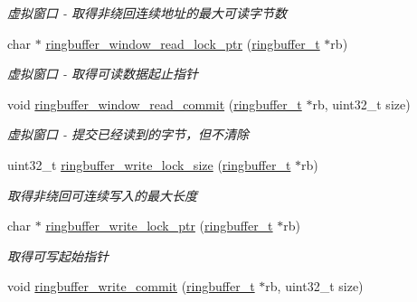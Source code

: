 \begin{DoxyCompactItemize}
\begin{DoxyCompactList}\small\item\em 虚拟窗口 -\/ 取得非绕回连续地址的最大可读字节数 \end{DoxyCompactList}\item 
char $\ast$ \hyperlink{a00083_a2fc4c4b70a7f3959c0c82c99432ed04d_a2fc4c4b70a7f3959c0c82c99432ed04d}{ringbuffer\+\_\+window\+\_\+read\+\_\+lock\+\_\+ptr} (\hyperlink{a00050_af929c5cf86b6a0f64dde407dfe60482e_af929c5cf86b6a0f64dde407dfe60482e}{ringbuffer\+\_\+t} $\ast$rb)
\begin{DoxyCompactList}\small\item\em 虚拟窗口 -\/ 取得可读数据起止指针 \end{DoxyCompactList}\item 
void \hyperlink{a00083_a5bccc516abce64ee739ed00bf055d42e_a5bccc516abce64ee739ed00bf055d42e}{ringbuffer\+\_\+window\+\_\+read\+\_\+commit} (\hyperlink{a00050_af929c5cf86b6a0f64dde407dfe60482e_af929c5cf86b6a0f64dde407dfe60482e}{ringbuffer\+\_\+t} $\ast$rb, uint32\+\_\+t size)
\begin{DoxyCompactList}\small\item\em 虚拟窗口 -\/ 提交已经读到的字节，但不清除 \end{DoxyCompactList}\item 
uint32\+\_\+t \hyperlink{a00083_ada2b3f0cea4e372229709a5cb1f54725_ada2b3f0cea4e372229709a5cb1f54725}{ringbuffer\+\_\+write\+\_\+lock\+\_\+size} (\hyperlink{a00050_af929c5cf86b6a0f64dde407dfe60482e_af929c5cf86b6a0f64dde407dfe60482e}{ringbuffer\+\_\+t} $\ast$rb)
\begin{DoxyCompactList}\small\item\em 取得非绕回可连续写入的最大长度 \end{DoxyCompactList}\item 
char $\ast$ \hyperlink{a00083_a67c7cbb3e39d70fc9ef3e4938fbc6d1d_a67c7cbb3e39d70fc9ef3e4938fbc6d1d}{ringbuffer\+\_\+write\+\_\+lock\+\_\+ptr} (\hyperlink{a00050_af929c5cf86b6a0f64dde407dfe60482e_af929c5cf86b6a0f64dde407dfe60482e}{ringbuffer\+\_\+t} $\ast$rb)
\begin{DoxyCompactList}\small\item\em 取得可写起始指针 \end{DoxyCompactList}\item 
void \hyperlink{a00083_a88804c221b00561ac45b12b6e54bb8d1_a88804c221b00561ac45b12b6e54bb8d1}{ringbuffer\+\_\+write\+\_\+commit} (\hyperlink{a00050_af929c5cf86b6a0f64dde407dfe60482e_af929c5cf86b6a0f64dde407dfe60482e}{ringbuffer\+\_\+t} $\ast$rb, uint32\+\_\+t size)

\end{DoxyCompactItemize}
